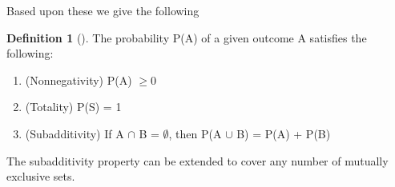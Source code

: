 \documentclass[10pt,]{book}
\theoremstyle{plain}
\theoremstyle{definition}
\newtheorem{definition}[theorem]{Definition}
\theoremstyle{definition}
\numberwithin{equation}{section}
\begin{document}
\par
Based upon these we give the following%
\begin{definition}[]\label{DefnProb}
The probability P(A) of a given outcome A satisfies the following:
		\leavevmode%
\begin{enumerate}
\item\hypertarget{li-4}{}(Nonnegativity) P(A) \(\ge 0\)\item\hypertarget{li-5}{}(Totality) P(S) = 1\item\hypertarget{li-6}{}(Subadditivity) If A \(\cap\) B = \(\emptyset\), then P(A \(\cup\) B) = P(A) + P(B)\end{enumerate}
\end{definition}
\par
The subadditivity property can be extended to cover any number of mutually exclusive sets.%
\typeout{************************************************}
\typeout{************************************************}
\end{document}
